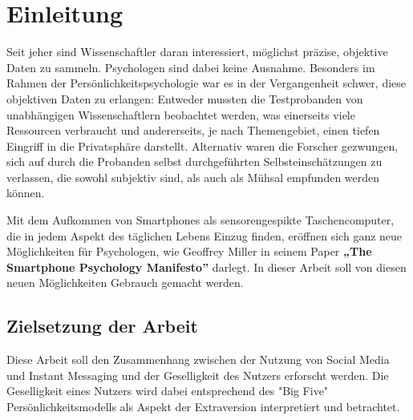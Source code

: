 
\chapter{Einleitung}
\label{ch:Einleitung}

Seit jeher sind Wissenschaftler daran interessiert, möglichst präzise, objektive Daten zu sammeln.
Psychologen sind dabei keine Ausnahme.
Besonders im Rahmen der Persönlichkeitspsychologie war es in der Vergangenheit schwer, diese objektiven Daten zu erlangen:
Entweder mussten die Testprobanden von unabhängigen Wissenschaftlern beobachtet werden,
was einerseits viele Ressourcen verbraucht und andererseits, je nach Themengebiet,
einen tiefen Eingriff in die Privatsphäre darstellt. Alternativ waren die Forscher gezwungen,
sich auf durch die Probanden selbst durchgeführten Selbsteinschätzungen zu verlassen,
die sowohl subjektiv sind, als auch als Mühsal empfunden werden können.\par

Mit dem Aufkommen von Smartphones als sensorengespikte Taschencomputer, die in jedem Aspekt des täglichen Lebens Einzug finden,
eröffnen sich ganz neue Möglichkeiten für Psychologen, wie Geoffrey Miller in seinem Paper \textbf{„The Smartphone Psychology Manifesto”} \cite{miller2012smartphone}
darlegt. In dieser Arbeit soll von diesen neuen Möglichkeiten Gebrauch gemacht werden.\par




\section{Zielsetzung der Arbeit}
\label{ch:Einleitung:sec:Zielsetzung}

Diese Arbeit soll den Zusammenhang zwischen der Nutzung von Social Media und Instant Messaging und der Geselligkeit des Nutzers erforscht werden.
Die Geselligkeit eines Nutzers wird dabei entsprechend des "Big Five" Persönlichkeitsmodells als Aspekt der Extraversion interpretiert und betrachtet.

